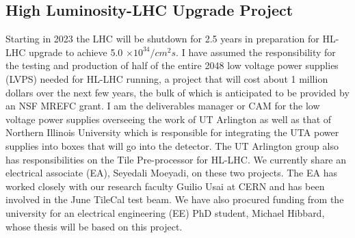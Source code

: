 \documentclass[11pt]{article}
\begin{document}
\subsection{High Luminosity-LHC Upgrade Project}
\label{sec:lvps}
Starting in 2023 the LHC will be shutdown for 2.5 years in preparation for HL-LHC upgrade to achieve 5.0 $\times 10^{34}/cm^2s$. 
I have assumed the responsibility for the testing and production of half of the entire 2048 low voltage power supplies (LVPS) needed for HL-LHC running, 
a project that will cost about 1 million dollars over the next few years, the bulk of which is anticipated to be provided by an NSF MREFC grant. 
I am the deliverables manager or CAM for the low voltage 
power supplies overseeing the work of UT Arlington as well as that of Northern Illinois University which is responsible for integrating the UTA power supplies into boxes that will go into the detector.
The UT Arlington group also has responsibilities on the Tile Pre-processor for HL-LHC.  We currently
share an electrical associate (EA), Seyedali Moeyadi, on these two projects.  The EA has worked closely with our research faculty Guilio Usai at CERN and has been involved in the June TileCal test beam.  We have also procured
funding from the university for an electrical engineering (EE) PhD student, Michael Hibbard, whose thesis will be based on this project.  
\end{document}
